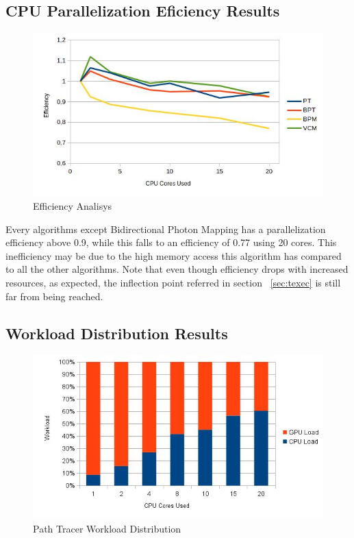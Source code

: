 \subsection{CPU Parallelization Eficiency Results}

\begin{figure}[H]
\centering
\includegraphics[width=0.8\linewidth]{img/efficiency.jpg}
\caption{\label{img:efficiency} Efficiency Analisys}
\end{figure}

Every algorithms except Bidirectional Photon Mapping has a parallelization efficiency above 0.9, while this falls to an efficiency of 0.77 using 20 cores. This inefficiency may be due to the high memory access this algorithm has compared to all the other algorithms. Note that even though efficiency drops with increased resources, as expected, the inflection point referred in section ~\ref{sec:texec} is still far from being reached.

\subsection{Workload Distribution Results}

\begin{figure}[H]
\centering
\includegraphics[width=0.8\linewidth]{img/ptwl.jpg}
\caption{\label{img:ptwl} Path Tracer Workload Distribution}
\end{figure}

